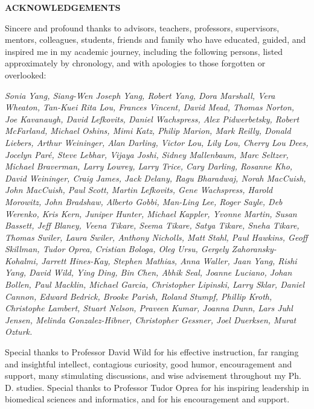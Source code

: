 \begin{centering}
\textbf{ACKNOWLEDGEMENTS}\\
\vspace{\baselineskip}
\end{centering}

Sincere and profound thanks to advisors, teachers, professors, supervisors, mentors, colleagues, students, friends and family who have educated, guided, and inspired me in my academic journey, including the following persons, listed approximately by chronology, and with apologies to those forgotten or overlooked:

\begin{singlespace}
\textit{Sonia Yang, Siang-Wen Joseph Yang, Robert Yang, Dora Marshall,
Vera Wheaton, Tan-Kuei Rita Lou, Frances Vincent, David Mead, Thomas
Norton, Joe Kavanaugh, David Lefkovits, Daniel Wachspress, Alex
Pidwerbetsky, Robert McFarland, Michael Oshins, Mimi Katz, Philip
Marion, Mark Reilly, Donald Liebers, Arthur Weininger, Alan Darling,
Victor Lou, Lily Lou, Cherry Lou Dees, Jocelyn Par\'e, Steve Lebhar,
Vijaya Joshi, Sidney Mallenbaum, Marc Seltzer, Michael Braverman, Larry
Lowrey, Larry Trice, Cary Darling, Rosanne Kho, David Weininger, Craig
James, Jack Delany, Ragu Bharadwaj, Norah MacCuish, John MacCuish, Paul
Scott, Martin Lefkovits, Gene Wachspress, Harold Morowitz, John
Bradshaw, Alberto Gobbi, Man-Ling Lee, Roger Sayle, Deb Werenko, Kris
Kern, Juniper Hunter, Michael Kappler, Yvonne Martin, Susan Bassett,
Jeff Blaney, Veena Tikare, Seema Tikare, Satya Tikare, Sneha Tikare,
Thomas Swiler, Laura Swiler, Anthony Nicholls, Matt Stahl, Paul
Hawkins, Geoff Skillman, Tudor Oprea, Cristian Bologa, Oleg Ursu,
Gergely Zahoransky-Kohalmi, Jarrett Hines-Kay, Stephen Mathias, Anna
Waller, Jaan Yang, Rishi Yang, David Wild, Ying Ding, Bin Chen, Abhik
Seal, Joanne Luciano, Johan Bollen, Paul Macklin, Michael Garcia,
Christopher Lipinski, Larry Sklar, Daniel Cannon, Edward Bedrick,
Brooke Parish, Roland Stumpf, Phillip Kroth, Christophe Lambert,
Stuart Nelson, Praveen Kumar, Joanna Dunn, Lars Juhl Jensen,
Melinda Gonzalez-Hibner, Christopher Gessner, Joel Duerksen,
Murat Ozturk.}
\end{singlespace}

Special thanks to Professor David Wild for his effective instruction, far ranging and insightful intellect, contagious curiosity, good humor, encouragement and support, many stimulating discussions, and wise advisement throughout my Ph. D. studies. Special thanks to Professor Tudor Oprea for his inspiring leadership in biomedical sciences and informatics, and for his encouragement and support. 
